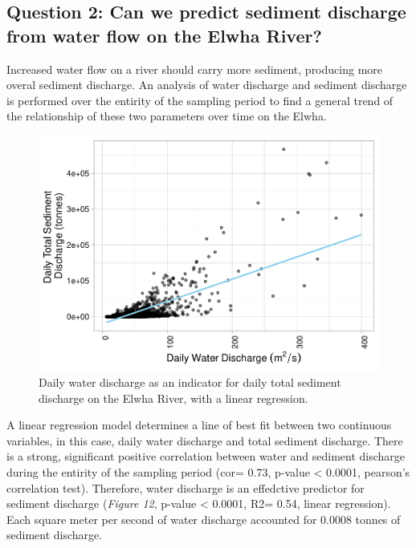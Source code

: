 \documentclass[12pt,]{article}
\begin{document}
\newpage

\hypertarget{question-2-can-we-predict-sediment-discharge-from-water-flow-on-the-elwha-river}{%
\subsection{Question 2: Can we predict sediment discharge from water
flow on the Elwha
River?}\label{question-2-can-we-predict-sediment-discharge-from-water-flow-on-the-elwha-river}}

Increased water flow on a river should carry more sediment, producing
more overal sediment discharge. An analysis of water discharge and
sediment discharge is performed over the entirity of the sampling period
to find a general trend of the relationship of these two parameters over
time on the Elwha.

\begin{figure}
\centering
\includegraphics{Mason_ENV872_ProjectFinal_files/figure-latex/Linear Regression (figure 12)-1.pdf}
\caption{Daily water discharge as an indicator for daily total sediment
discharge on the Elwha River, with a linear regression.}
\end{figure}

A linear regression model determines a line of best fit between two
continuous variables, in this case, daily water discharge and total
sediment discharge. There is a strong, significant positive correlation
between water and sediment discharge during the entirity of the sampling
period (cor= 0.73, p-value \textless{} 0.0001, pearson's correlation
test). Therefore, water discharge is an effedctive predictor for
sediment discharge (\emph{Figure 12}, p-value \textless{} 0.0001, R2=
0.54, linear regression). Each square meter per second of water
discharge accounted for 0.0008 tonnes of sediment discharge.
\end{document}
